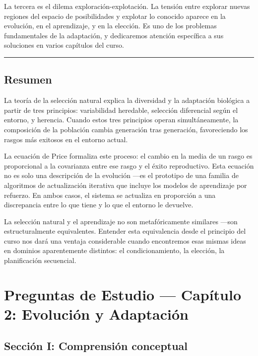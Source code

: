 \documentclass[
  letterpaper,
  DIV=11,
  numbers=noendperiod]{scrreprt}
\begin{document}
La tercera es el dilema exploración-explotación. La tensión entre
explorar nuevas regiones del espacio de posibilidades y explotar lo
conocido aparece en la evolución, en el aprendizaje, y en la elección.
Es uno de los problemas fundamentales de la adaptación, y dedicaremos
atención específica a sus soluciones en varios capítulos del curso.

\begin{center}\rule{0.5\linewidth}{0.5pt}\end{center}

\section{Resumen}\label{resumen}

La teoría de la selección natural explica la diversidad y la adaptación
biológica a partir de tres principios: variabilidad heredable, selección
diferencial según el entorno, y herencia. Cuando estos tres principios
operan simultáneamente, la composición de la población cambia generación
tras generación, favoreciendo los rasgos más exitosos en el entorno
actual.

La ecuación de Price formaliza este proceso: el cambio en la media de un
rasgo es proporcional a la covarianza entre ese rasgo y el éxito
reproductivo. Esta ecuación no es solo una descripción de la evolución
---es el prototipo de una familia de algoritmos de actualización
iterativa que incluye los modelos de aprendizaje por refuerzo. En ambos
casos, el sistema se actualiza en proporción a una discrepancia entre lo
que tiene y lo que el entorno le devuelve.

La selección natural y el aprendizaje no son metafóricamente similares
---son estructuralmente equivalentes. Entender esta equivalencia desde
el principio del curso nos dará una ventaja considerable cuando
encontremos esas mismas ideas en dominios aparentemente distintos: el
condicionamiento, la elección, la planificación secuencial.


\chapter{Preguntas de Estudio --- Capítulo 2: Evolución y
Adaptación}\label{preguntas-de-estudio-capuxedtulo-2-evoluciuxf3n-y-adaptaciuxf3n}

\section{Sección I: Comprensión
conceptual}\label{secciuxf3n-i-comprensiuxf3n-conceptual}
\end{document}
